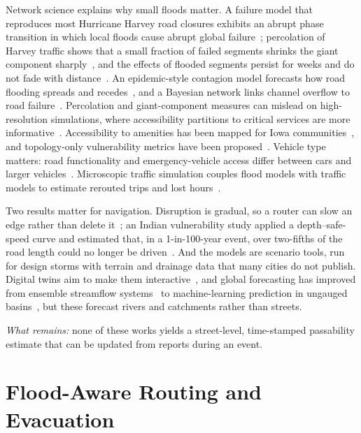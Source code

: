 \documentclass[journal]{IEEEtran}
\begin{document}
Network science explains why small floods matter. A failure model that reproduces most Hurricane Harvey road closures exhibits an abrupt phase transition in which local floods cause abrupt global failure~\cite{wang2019percolation}; percolation of Harvey traffic shows that a small fraction of failed segments shrinks the giant component sharply~\cite{dong2022modest}, and the effects of flooded segments persist for weeks and do not fade with distance~\cite{rajput2023anatomy}. An epidemic-style contagion model forecasts how road flooding spreads and recedes~\cite{fan2020contagion}, and a Bayesian network links channel overflow to road failure~\cite{dong2020bayesian}. Percolation and giant-component measures can mislead on high-resolution simulations, where accessibility partitions to critical services are more informative~\cite{loreti2022local}. Accessibility to amenities has been mapped for Iowa communities~\cite{alabbad2021iowa}, and topology-only vulnerability metrics have been proposed~\cite{morelli2021vulnerability}. Vehicle type matters: road functionality and emergency-vehicle access differ between cars and larger vehicles~\cite{he2024functionality,he2026ems}. Microscopic traffic simulation couples flood models with traffic models to estimate rerouted trips and lost hours~\cite{pyatkova2018micro}.

Two results matter for navigation. Disruption is gradual, so a router can slow an edge rather than delete it~\cite{pregnolato2017depth}; an Indian vulnerability study applied a depth--safe-speed curve and estimated that, in a 1-in-100-year event, over two-fifths of the road length could no longer be driven~\cite{singh2018vulnerability}. And the models are scenario tools, run for design storms with terrain and drainage data that many cities do not publish. Digital twins aim to make them interactive~\cite{kaynak2025twin,mandal2026flowsdt}, and global forecasting has improved from ensemble streamflow systems~\cite{alfieri2013glofas} to machine-learning prediction in ungauged basins~\cite{nearing2024global}, but these forecast rivers and catchments rather than streets.

\emph{What remains:} none of these works yields a street-level, time-stamped passability estimate that can be updated from reports during an event.

\section{Flood-Aware Routing and Evacuation}\label{sec:routing}
\end{document}
